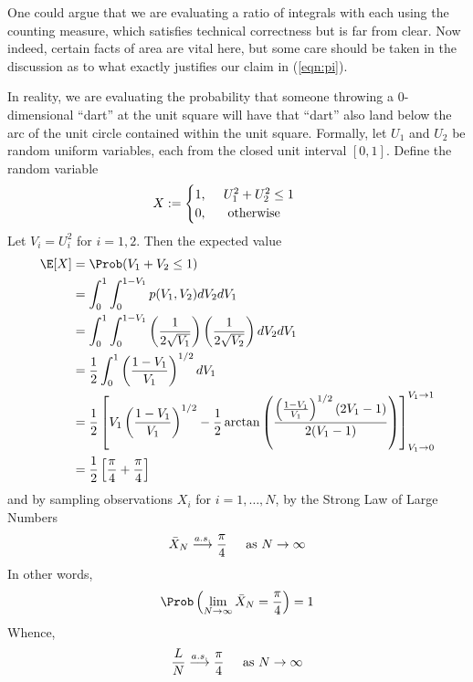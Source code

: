 One could argue that we are evaluating a ratio of integrals with each using
the counting measure, which satisfies technical correctness but is far from
clear. Now indeed, certain facts of area are vital here, but some care should
be taken in the discussion as to what exactly justifies our claim in
(\ref{eqn:pi}).

In reality, we are evaluating the probability that someone throwing a
0-dimensional ``dart'' at the unit square will have that ``dart'' also
land below the arc of the unit circle contained within the unit square.
Formally, let $U_1$ and $U_2$ be random uniform variables, each from the
closed unit interval $[0, 1]$.  Define the random variable
\begin{align*}
X &:= 
\begin{cases} 
1\text{, } \hspace{.4cm} U_1^2 + U_2^2 \leq 1\\ 
0\text{, \hspace{.4cm} otherwise}
\end{cases}
\end{align*}
Let $V_i = U_i^2$ for $i=1, 2$. Then the expected value
\begin{align*}
\E[X] &= \Prob( V_1 + V_2 \leq 1 )\\
     &= \int_0^1 \int_0^{1-V_1} p(V_1, V_2)dV_2 dV_1\\
     &= \int_0^1 \int_0^{1-V_1} \left( \frac{1}{2\sqrt{V_1}} \right)
        \left( \frac{1}{2\sqrt{V_2}} \right)dV_2 dV_1\\
     &= \frac{1}{2}\int_0^1 \left(\frac{1-V_1}{V_1}\right)^{1/2}dV_1\\
     &= \frac{1}{2} \left[ 
	V_1\left(\frac{1-V_1}{V_1}\right)^{1/2} 
	 - \frac{1}{2} \arctan\left(\frac{\left(\frac{1-V_1}{V_1}\right)^{1/2}
        (2V_1-1)}{2(V_1-1)}\right) 
	\right]_{V_1\rightarrow 0}^{V_1\rightarrow 1}\\
     &= \frac{1}{2}\left[ \frac{\pi}{4} +\frac{\pi}{4}  \right]
\end{align*}
and by sampling observations $X_i$ for $i=1,\dots,N$, by the Strong Law of
Large Numbers~
\begin{equation}
\bar{X}_N \stackrel{a.s.}{\longrightarrow} \frac{\pi}{4}
\hspace{.4cm} \text{ as } N\rightarrow \infty
\index{Convergence!a.s.}
\label{eqn:as_convergence}
\end{equation}
In other words,
\begin{align*}
\Prob\left(\lim_{N\rightarrow\infty} \bar{X}_N = \frac{\pi}{4}\right) = 1
\end{align*}
Whence,
\begin{align*}
\frac{L}{N} \stackrel{a.s.}{\longrightarrow} \frac{\pi}{4} \hspace{.4cm}
\text{ as } N\rightarrow \infty
\end{align*}


